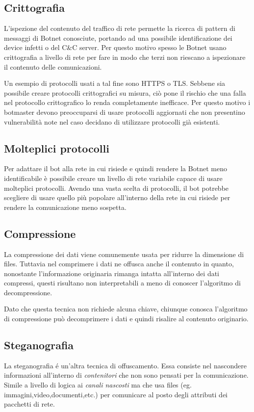  \subsection*{Crittografia}
 L'ispezione del contenuto del traffico di rete permette la ricerca di pattern di messaggi  di Botnet conosciute, portando ad una possibile identificazione dei device infetti o del C\&C server. 
 Per questo motivo spesso le Botnet usano crittografia a livello di rete per fare in modo che terzi non riescano a ispezionare il contenuto delle comunicazioni. 

 Un esempio di protocolli usati a tal fine sono HTTPS o TLS. Sebbene sia possibile creare protocolli crittografici su misura, ciò pone il rischio che una falla nel protocollo crittografico lo renda completamente inefficace. Per questo motivo i botmaster devono preoccuparsi di usare protocolli aggiornati che non presentino vulnerabilità note nel caso decidano di utilizzare protocolli già esistenti.

 \subsection*{Molteplici protocolli}
 Per adattare il bot alla rete in cui risiede e quindi rendere la Botnet meno identificabile è possibile creare un livello di rete variabile capace di usare molteplici protocolli. Avendo una vasta scelta di protocolli, il bot potrebbe scegliere di usare quello più popolare all'interno della rete in cui risiede per rendere la comunicazione meno sospetta.

 \subsection*{Compressione}
 La compressione dei dati viene comunemente usata per ridurre la dimensione di files. Tuttavia nel comprimere i dati ne offusca anche il contenuto in quanto, nonostante l'informazione originaria rimanga intatta all'interno dei dati compressi, questi risultano non interpretabili a meno di conoscer l'algoritmo di decompressione.
 
 Dato che questa tecnica non richiede alcuna chiave, chiunque conosca l'algoritmo di compressione può  decomprimere i dati e quindi risalire al contenuto originario.

 \subsection*{Steganografia}
 La steganografia é un'altra tecnica di offuscamento. Essa consiste nel nascondere informazioni all'interno di \textit{contenitori} che non sono pensati per la comunicazione. Simile a livello di logica ai \emph{canali nascosti} ma che usa files (eg. immagini,video,documenti,etc.) per comunicare al posto degli attributi dei  pacchetti di rete.

